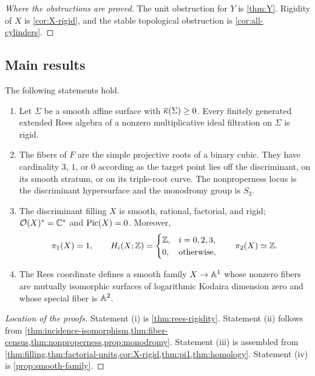 \begin{proof}[Where the obstructions are proved]
The unit obstruction for $Y$ is \cref{thm:Y}.  Rigidity of $X$ is \cref{cor:X-rigid}, and the stable topological obstruction is \cref{cor:all-cylinders}.
\end{proof}

\subsection{Main results}

\begin{theorem}\label{thm:main-results}
The following statements hold.
\begin{enumerate}[label=\textup{(\roman*)},leftmargin=2.5em]
\item Let $\Sigma$ be a smooth affine surface with $\overline\kappa(\Sigma)\geq0$.  Every finitely generated extended Rees algebra of a nonzero multiplicative ideal filtration on $\Sigma$ is rigid.
\item The fibers of $F$ are the simple projective roots of a binary cubic.  They have cardinality $3$, $1$, or $0$ according as the target point lies off the discriminant, on its smooth stratum, or on its triple-root curve.  The nonproperness locus is the discriminant hypersurface and the monodromy group is $S_3$.
\item The discriminant filling $X$ is smooth, rational, factorial, and rigid; $\mathcal O(X)^*=\mathbb C^*$ and $\operatorname{Pic}(X)=0$.  Moreover,
\[
  \pi_1(X)=1,
  \qquad
  H_i(X;\mathbb Z)=
  \begin{cases}
    \mathbb Z,&i=0,2,3,\\
    0,&\text{otherwise},
  \end{cases}
  \qquad
  \pi_2(X)\simeq\mathbb Z.
\]
\item The Rees coordinate defines a smooth family $X\to\mathbb A^1$ whose nonzero fibers are mutually isomorphic surfaces of logarithmic Kodaira dimension zero and whose special fiber is $\mathbb A^2$.
\end{enumerate}
\end{theorem}

\begin{proof}[Location of the proofs]
Statement (i) is \cref{thm:rees-rigidity}.  Statement (ii) follows from \cref{thm:incidence-isomorphism,thm:fiber-census,thm:nonproperness,prop:monodromy}.  Statement (iii) is assembled from \cref{thm:filling,thm:factorial-units,cor:X-rigid,thm:pi1,thm:homology}.  Statement (iv) is \cref{prop:smooth-family}.
\end{proof}

